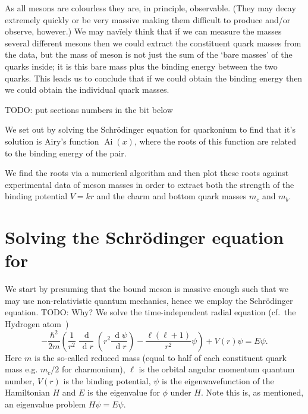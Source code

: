 \documentclass[]{article}
\renewcommand{\d}[1]{\ensuremath{\,\operatorname{d}\!{#1}}}
\newcommand{\Ai}[1]{\ensuremath{\operatorname{Ai}({#1})}}
\begin{document}

As all mesons are colourless they are, in principle, observable. (They may decay extremely quickly or be very massive making them difficult to produce and/or observe, however.) We may nav\"{i}ely think that if we can measure the masses several different mesons then we could extract the constituent quark masses from the data, but the mass of meson is not just the sum of the `bare masses' of the quarks inside; it is this bare mass plus the binding energy between the two quarks. This leads us to conclude that if we could obtain the binding energy then we could obtain the individual quark masses.

TODO: put sections numbers in the bit below

We set out by solving the Schr\"{o}dinger equation for quarkonium to find that it's solution is Airy's function $\Ai{x}$, where the roots of this function are related to the binding energy of the \qqbar pair.

We find the roots via a numerical algorithm and then plot these roots against experimental data of meson masses in order to extract both the strength of the binding potential $V=kr$ and the charm and bottom quark masses $m_{c}$ and $m_{b}$.


\section{Solving the Schr\"{o}dinger equation for \qqbar}\label{sec:schrodinger}

We start by presuming that the bound \qqbar meson is massive enough such that we may use non-relativistic quantum mechanics, hence we employ the Schr\"{o}dinger equation. TODO: Why? We solve the time-independent radial equation (cf.\ the Hydrogen atom~\cite{ref:dgriffithsquantum})
\begin{equation}\label{eqn:schrodinger}
-\frac{\hbar^{2}}{2m}\left (
	\frac{1}{r^{2}} \frac{\d{}}{\d{r}} \left (
		r^{2} \frac{\d{\psi}}{\d{r}}
	\right )
	- \frac{\ell(\ell+1)}{r^{2}}\psi
\right )
+ V(r)\psi = E\psi.
\end{equation}
Here $m$ is the so-called reduced mass (equal to half of each constituent quark mass e.g. $m_{c}/2$ for charmonium), $\ell$ is the orbital angular momentum quantum number, $V(r)$ is the binding potential, $\psi$ is the eigenwavefunction of the Hamiltonian $H$ and $E$ is the eigenvalue for $\phi$ under $H$. Note this is, as mentioned, an eigenvalue problem $H\psi=E\psi$.
\end{document}
